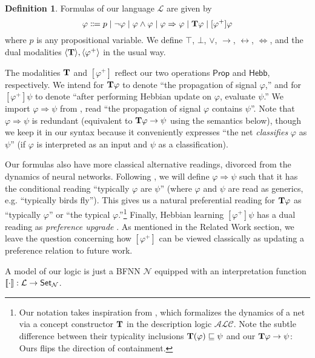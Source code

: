 \documentclass[letterpaper]{article}
\theoremstyle{definition}
\newtheorem{definition}{Definition}
\newcommand{\Set}{\mbox{\sf Set}}
\newcommand{\semantics}[1]{[\![\mbox{\em $ #1 $\/}]\!]}
\newcommand{\lang}{\mathcal{L}}
\newcommand{\Typ}{\textrm{\textup{\textbf{T}}}}
\newcommand{\Prop}{\textsf{Prop}}
\newcommand{\Inc}{\textsf{Hebb}}
\newcommand{\Net}{\mathcal{N}}
\begin{document}
\begin{definition}  Formulas of our language $\lang$ are given by
\[
\varphi \Coloneqq p \mid \neg \varphi \mid \varphi \land \varphi \mid \varphi \Rightarrow \varphi \mid \Typ \varphi \mid [\varphi^+] \varphi
\]
where $p$ is any propositional variable.  We define $\top$, $\bot$, $\lor$, $\to$, $\leftrightarrow$, $\Leftrightarrow$, and the dual modalities $\langle \Typ \rangle, \langle \varphi^+ \rangle$ in the usual way.
\end{definition}

The modalities $\Typ$ and $[\varphi^+]$ reflect our two operations $\Prop$ and $\Inc$, respectively.  We intend for $\Typ \varphi$ to denote ``the propagation of signal $\varphi$,'' and for $[\varphi^+] \psi$ to denote ``after performing Hebbian update on $\varphi$, evaluate $\psi$.''  We import ${\varphi \Rightarrow \psi}$ from \citep{leitgeb2001nonmonotonic}, read ``the propagation of signal $\varphi$ contains $\psi$''.  Note that ${\varphi \Rightarrow \psi}$ is redundant (equivalent to $\Typ \varphi \to \psi$ using the semantics below), though we keep it in our syntax because it conveniently expresses ``the net \emph{classifies} $\varphi$ as $\psi$'' (if $\varphi$ is interpreted as an input and $\psi$ as a classification).

Our formulas also have more classical alternative readings, divorced from the dynamics of neural networks.  Following \citep{leitgeb2001nonmonotonic}, we will define $\varphi \Rightarrow \psi$ such that it has the conditional reading ``typically $\varphi$ are $\psi$'' (where $\varphi$ and $\psi$ are read as generics, e.g. ``typically birds fly'').  This gives us a natural preferential reading for $\Typ \varphi$ as ``typically $\varphi$'' or ``the typical $\varphi$.''\footnote{Our notation takes inspiration from \citep{giordano2021}, which formalizes the dynamics of a net via a concept constructor $\Typ$ in the description logic $\mathcal{ALC}$.  Note the subtle difference between their typicality inclusions $\Typ(\varphi) \sqsubseteq \psi$ and our $\Typ \varphi \to \psi$: Ours flips the direction of containment.} 
Finally, Hebbian learning $[\varphi^+] \psi$ has a dual reading as \emph{preference upgrade}  \citep{van2007prefupgrade}.  As mentioned in the Related Work section, we leave the question concerning how $[\varphi^+]$ can be viewed classically as updating a preference relation to future work.

A model of our logic is just a BFNN $\Net$ equipped with an interpretation function $\semantics{\cdot} : \lang \to \Set_\Net$.
\end{document}
